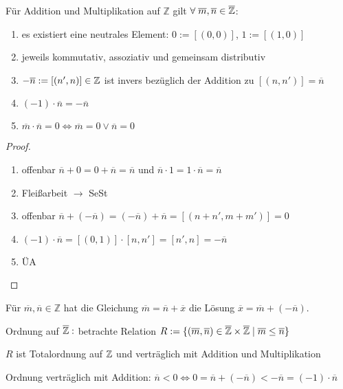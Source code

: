 \begin{satz}
	Für Addition und Multiplikation auf $\mathbb Z$ gilt $\forall\;\overline m, 
	\overline{n} \in \overline{\mathbb{Z}}$:
	\begin{enumerate}
		\item es existiert eine neutrales Element: $0:=[(0,0)]$, $1:=[(1,0)]$
		\item jeweils kommutativ, assoziativ und gemeinsam distributiv
		\item $- \overline{n} := [(n',n)] \in \mathbb{Z}$ ist invers bezüglich der Addition zu 
		$[(n,n')] = \overline n$
		\item $(-1) \cdot \overline n = - \overline n$
		\item $\overline m \cdot \overline n = 0 \iff \overline m =0 \lor \overline n=0$
	\end{enumerate}
\end{satz}

\begin{proof}
	\begin{enumerate}[zu 1)]
		\item offenbar $\overline n +0=0+\overline n=\overline n$ und $\overline n \cdot 1 = 1 \cdot 
		\overline n = \overline n$
		\item Fleißarbeit $\to$ SeSt
		\item offenbar $\overline n+(- \overline n) = (- \overline n)+\overline n=[(n+n',m+m')]=0$
		\item $(-1)\cdot \overline n = [(0,1)]\cdot [n,n']=[n',n]=-\overline n$
		\item ÜA \QEDA
	\end{enumerate}
		
\end{proof}

\begin{satz}
	Für $\overline m, \overline n \in \mathbb Z$ hat die Gleichung $\overline m=\overline n + \overline x$ die Lösung $\overline x=\overline m+(-\overline n)$.
\end{satz}

\noindent Ordnung auf $\overline{\mathbb{Z}}:$ betrachte Relation $R := \{(\overline{m},\overline{n}) \in 
\overline{\mathbb{Z}} \times \overline{\mathbb{Z}} \mid \overline{m} \le \overline{n}\}$

\begin{satz}
	$R$ ist Totalordnung auf $\mathbb{Z}$ und verträglich mit Addition und 
	Multiplikation
\end{satz}

\noindent Ordnung verträglich mit Addition: $\overline n < 0 \iff 0=\overline n+(-\overline n) < -\overline n
= (-1) \cdot \overline n$ \\

